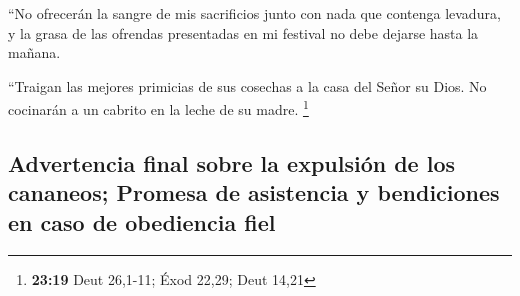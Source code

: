  ``No ofrecerán la sangre de mis sacrificios junto con
nada que contenga levadura, y la grasa de las ofrendas presentadas en mi
festival no debe dejarse hasta la mañana.

 ``Traigan las mejores primicias de sus cosechas a la
casa del Señor su Dios. No cocinarán a un cabrito en la leche de su
madre. \footnote{\textbf{23:19} Deut 26,1-11; Éxod 22,29; Deut 14,21}

\hypertarget{advertencia-final-sobre-la-expulsiuxf3n-de-los-cananeos-promesa-de-asistencia-y-bendiciones-en-caso-de-obediencia-fiel}{%
\subsection{Advertencia final sobre la expulsión de los cananeos;
Promesa de asistencia y bendiciones en caso de obediencia
fiel}\label{advertencia-final-sobre-la-expulsiuxf3n-de-los-cananeos-promesa-de-asistencia-y-bendiciones-en-caso-de-obediencia-fiel}}


